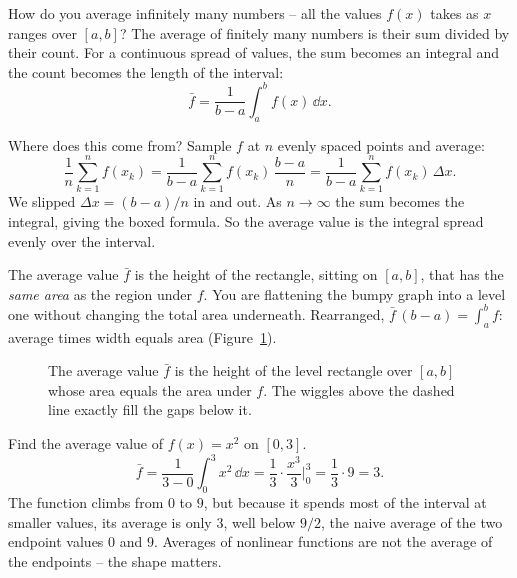 How do you average infinitely many numbers -- all the values $f(x)$ takes as $x$
ranges over $[a,b]$? The average of finitely many numbers is their sum divided by
their count. For a continuous spread of values, the sum becomes an integral and the
count becomes the length of the interval:
\[
  \boxed{\,\bar f = \frac{1}{b-a}\int_a^b f(x)\,\dd x.\,}
\]

Where does this come from? Sample $f$ at $n$ evenly spaced points and average:
\[
  \frac{1}{n}\sum_{k=1}^n f(x_k)
  = \frac{1}{b-a}\sum_{k=1}^n f(x_k)\,\frac{b-a}{n}
  = \frac{1}{b-a}\sum_{k=1}^n f(x_k)\,\Delta x.
\]
We slipped $\Delta x = (b-a)/n$ in and out. As $n\to\infty$ the sum becomes the
integral, giving the boxed formula. So the average value is the integral spread
evenly over the interval.

\begin{intuitionbox}
The average value $\bar f$ is the height of the rectangle, sitting on $[a,b]$, that
has the \emph{same area} as the region under $f$. You are flattening the bumpy
graph into a level one without changing the total area underneath. Rearranged,
$\bar f\,(b-a) = \int_a^b f$: average times width equals area
(Figure~\ref{ch26:fig-average}).
\end{intuitionbox}

\begin{figure}[H]
\centering
{}
\caption{The average value $\bar f$ is the height of the level rectangle over
$[a,b]$ whose area equals the area under $f$. The wiggles above the dashed line
exactly fill the gaps below it.}
\label{ch26:fig-average}
\end{figure}

\begin{example}
\label{ch26:ex-average}
Find the average value of $f(x) = x^2$ on $[0,3]$.
\[
  \bar f = \frac{1}{3-0}\int_0^3 x^2\,\dd x
         = \frac13\cdot\frac{x^3}{3}\Big|_0^3
         = \frac13\cdot 9 = 3.
\]
The function climbs from $0$ to $9$, but because it spends most of the interval at
smaller values, its average is only $3$, well below $9/2$, the naive average of the
two endpoint values $0$ and $9$. Averages of nonlinear functions are not the average
of the endpoints -- the shape matters.
\end{example}

